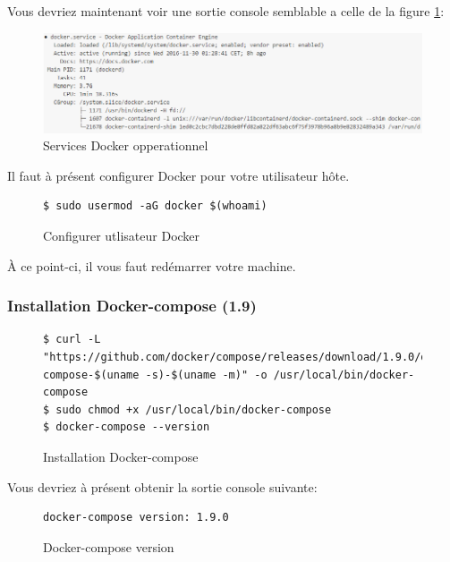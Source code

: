 Vous devriez maintenant voir une sortie console semblable a celle de la figure \ref{fig:dockerservices}:

\begin{figure}[H] 
\centering 
\includegraphics[width=1\columnwidth]{img/docker-services} 
\caption[docker services]{Services Docker opperationnel}
\label{fig:dockerservices} 
\end{figure}

Il faut à présent configurer Docker pour votre utilisateur hôte.

\begin{figure}[H] 
\centering
\begin{lstlisting}[frame=single]
$ sudo usermod -aG docker $(whoami)
\end{lstlisting}
\caption[Code - Configurer utlisateur Docker]{Configurer utlisateur Docker}
\label{fig:configUserDocker} 
\end{figure}

À ce point-ci, il vous faut redémarrer votre machine.

\subsubsection{Installation Docker-compose (1.9)}

\begin{figure}[H] 
\centering 
\begin{lstlisting}[frame=single]
$ curl -L "https://github.com/docker/compose/releases/download/1.9.0/docker-compose-$(uname -s)-$(uname -m)" -o /usr/local/bin/docker-compose
$ sudo chmod +x /usr/local/bin/docker-compose
$ docker-compose --version
\end{lstlisting}
\caption[Code - Installation Docker-compose]{Installation Docker-compose}
\label{fig:installCompose} 
\end{figure}

Vous devriez à présent obtenir la sortie console suivante:

\begin{figure}[H] 
\centering 
\begin{lstlisting}[frame=single]
docker-compose version: 1.9.0
\end{lstlisting}
\caption[Code - Docker-compose version]{Docker-compose version}
\label{fig:composeVersion} 
\end{figure}

